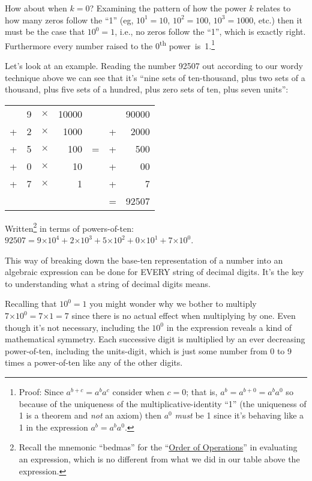 \documentclass{article}
\begin{document}
How about when $k=0$?
Examining the pattern of how the power $k$ relates to how many zeros follow the ``1''
(eg, $10^1=10$, $10^2=100$, $10^3=1000$,
etc.) then it must be the case that $10^0=1$,
i.e., no zeros follow the ``1'', which is exactly right.
Furthermore every number raised to the 0\textsuperscript{th}
power~is~1.\footnote{Proof: Since $a^{b+c}=a^ba^c$ consider when $c=0$; that is,
$a^b=a^{b+0}=a^ba^0$ so because of the uniqueness
of the multiplicative-identity ``1'' (the uniqueness of 1
is a theorem and \emph{not} an axiom) then $a^0$ \emph{must} be 1 since it's behaving 
like a 1 in the expression $a^b=a^ba^0$.}

Let's look at an example.
Reading the number 92507 out according to our wordy technique above we can see
that it's ``nine sets of ten-thousand,
plus two sets of a thousand, plus five sets of a hundred,
plus zero sets of ten, plus seven units'':

\begin{center}
\begin{tabular}{r r r r c r r}
\phantom & 9 & $\times$ & 10000 & \phantom & \phantom & 90000\\
+ & 2 & $\times$ & 1000 & \phantom & + & 2000\\
+ & 5 & $\times$ & 100 & \; \; \; = \; \; \; & + & 500\\
+ & 0 & $\times$ & 10 & \phantom & + & 00\\
+ & 7 & $\times$ & 1 & \phantom & + & 7\\
\cline{6-7}
\phantom & \phantom & \phantom & \phantom & \phantom & = & 92507
\end{tabular}
\end{center}

Written\footnote{Recall the mnemonic ``bedmas'' for
the ``\href{https://en.wikipedia.org/wiki/Order_of_operations}{Order of Operations}'' in
evaluating an expression, which is no different from
what we did in our table above the expression.}
in terms of powers-of-ten:
$92507=9{\times{}}10^4+2{\times{}}10^3+5{\times{}}10^2+0{\times{}}10^1+7{\times{}}10^0$.

This way of breaking down the base-ten representation of a number into
an algebraic expression can be done for EVERY string of decimal digits. It's the key to 
understanding what a string of decimal digits means.

Recalling that $10^0 = 1$ you might wonder why we bother to multiply
$7{\times{}}10^0=7{\times{}}1=7$ since there is no actual effect
when multiplying by one.
Even though it's not necessary, including the $10^0$ in the
expression reveals a kind of mathematical symmetry.
Each successive digit is multiplied by an ever
decreasing power-of-ten, including
the units-digit,
which is just some number from 0 to 9 times a power-of-ten
like any of the other digits.
\end{document}
